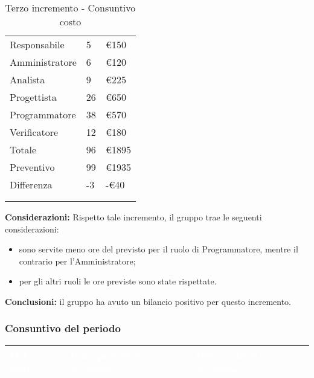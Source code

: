 {{\begin{longtable}{C{.4\freewidth} C{.2\freewidth} C{.2\freewidth}}
      Responsabile & 5 & €150 \\
      Amministratore & 6 & €120 \\
      Analista & 9 & €225 \\
      Progettista & 26 & €650 \\
      Programmatore & 38 & €570 \\
      Verificatore & 12 & €180 \\
      Totale & 96 & €1895 \\
      Preventivo & 99 & €1935 \\
      Differenza & -3 & -€40  \\
      \bottomrule
      \\
      \caption{Terzo incremento - Consuntivo costo}

      \end{longtable} 
      
      \textbf{Considerazioni:} 
        Rispetto tale incremento, il gruppo trae le seguenti considerazioni:
        \begin{itemize}
            \item sono servite meno ore del previsto per il ruolo di Programmatore, mentre il contrario per l'Amministratore;
            \item per gli altri ruoli le ore previste sono state rispettate.
        \end{itemize}

        \textbf{Conclusioni:} il gruppo ha avuto un bilancio positivo per questo incremento. 
    }

    \newpage    
    \subsubsection{Consuntivo del periodo} {
        \setlength{\freewidth}{\dimexpr\textwidth-30\tabcolsep}
        \renewcommand{\arraystretch}{1.0}
        \setlength{\aboverulesep}{0pt}
        \setlength{\belowrulesep}{0pt}
        \begin{longtable}{C{.4\freewidth} C{.4\freewidth} C{.4\freewidth}}
        \toprule
        \textcolor{white}{\textbf{Data inizio}}&
        \textcolor{white}{\textbf{Data previsione revisione}}&
        \textcolor{white}{\textbf{Data richiesta revisione}} \\
        \toprule
        \endhead
            

\end{longtable}}}
